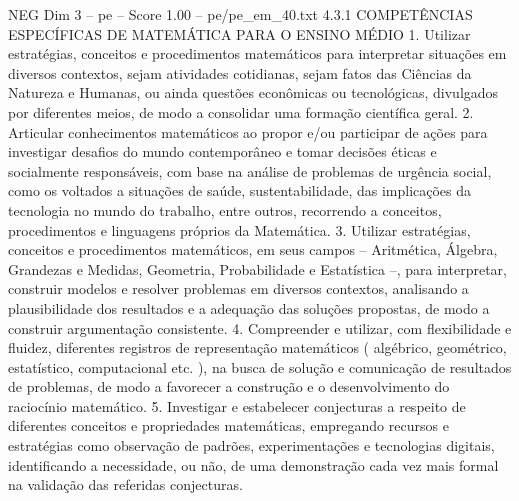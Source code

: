 \begin{textsample}{NEG Dim 3 – pe – Score 1.00 – pe/pe\_em\_40.txt}  \label{ex:f3_neg_005}
4.3.1 COMPETÊNCIAS ESPECÍFICAS DE MATEMÁTICA PARA O ENSINO MÉDIO 1.
Utilizar estratégias, conceitos e procedimentos matemáticos para interpretar situações em diversos contextos, sejam atividades cotidianas, sejam fatos das Ciências da Natureza e Humanas, ou ainda questões econômicas ou tecnológicas, divulgados por diferentes meios, de modo a consolidar uma formação científica geral. 2.
Articular conhecimentos matemáticos ao propor e/ou participar de ações para investigar desafios do mundo contemporâneo e tomar decisões éticas e socialmente responsáveis, com base na análise de problemas de urgência social, como os voltados a situações de saúde, sustentabilidade, das implicações da tecnologia no mundo do trabalho, entre outros, recorrendo a conceitos, procedimentos e linguagens próprios da Matemática. 3.
Utilizar estratégias, conceitos e procedimentos matemáticos, em seus campos – Aritmética, Álgebra, Grandezas e Medidas, Geometria, Probabilidade e Estatística –, para interpretar, construir modelos e resolver problemas em diversos contextos, analisando a plausibilidade dos resultados e a adequação das soluções propostas, de modo a construir argumentação consistente. 4.
Compreender e utilizar, com flexibilidade e fluidez, diferentes registros de representação matemáticos ( algébrico, geométrico, estatístico, computacional etc. ), na busca de solução e comunicação de resultados de problemas, de modo a favorecer a construção e o desenvolvimento do raciocínio matemático. 5.
Investigar e estabelecer conjecturas a respeito de diferentes conceitos e propriedades matemáticas, empregando recursos e estratégias como observação de padrões, experimentações e tecnologias digitais, identificando a necessidade, ou não, de uma demonstração cada vez mais formal na validação das referidas conjecturas.

\end{textsample}
